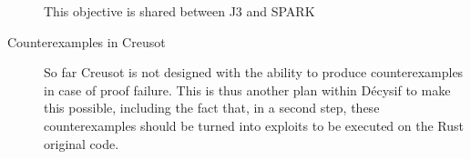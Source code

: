 \documentclass[a4paper,11pt]{article}
\begin{document}
\begin{description}
  This objective is shared between J3 and SPARK

\item[Counterexamples in Creusot]


  So far Creusot is not designed with the ability to produce counterexamples in
  case of proof failure. This is thus another plan within Décysif to make this
  possible, including the fact that, in a second step, these counterexamples
  should be turned into exploits to be executed on the Rust original code.

\end{description}


%


\end{document}
